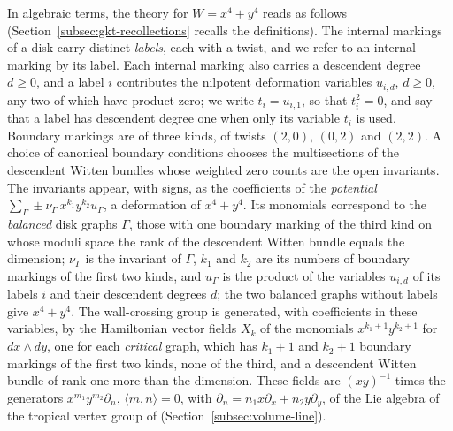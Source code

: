 In algebraic terms, the theory for $W=x^4+y^4$ reads as follows
(Section~\ref{subsec:gkt-recollections} recalls the definitions).  The
internal markings of a disk carry distinct \emph{labels}, each with a twist,
and we refer to an internal marking by its label.  Each internal marking
also carries a descendent degree $d\geq0$, and a label $i$ contributes the
nilpotent deformation variables $u_{i,d}$, $d\geq0$, any two of which have
product zero; we write $t_i=u_{i,1}$, so that $t_i^2=0$, and say that a
label has descendent degree one when only its variable $t_i$ is used.
Boundary markings are of three kinds, of twists $(2,0)$, $(0,2)$ and
$(2,2)$.  A choice of canonical boundary conditions chooses the
multisections of the descendent Witten bundles whose weighted zero counts
are the open invariants.  The invariants appear, with signs, as the
coefficients of the \emph{potential}
$\sum_\Gamma\pm\nu_\Gamma\,x^{k_1}y^{k_2}u_\Gamma$, a deformation of
$x^4+y^4$.  Its monomials correspond to the \emph{balanced} disk graphs
$\Gamma$, those with one boundary marking of the third kind on whose moduli
space the rank of the descendent Witten bundle equals the dimension;
$\nu_\Gamma$ is the invariant of $\Gamma$, $k_1$ and $k_2$ are its numbers of
boundary markings of the first two kinds, and $u_\Gamma$ is the product of
the variables $u_{i,d}$ of its labels $i$ and their descendent degrees $d$;
the two balanced graphs without labels give $x^4+y^4$.  The wall-crossing
group is generated, with coefficients in these variables, by the
Hamiltonian vector fields $X_k$ of the monomials $x^{k_1+1}y^{k_2+1}$ for
$dx\wedge dy$, one for each \emph{critical} graph, which has $k_1+1$ and
$k_2+1$ boundary markings of the first two kinds, none of the third, and a
descendent Witten bundle of rank one more than the dimension.  These fields are $(xy)^{-1}$ times the generators
$x^{m_1}y^{m_2}\partial_n$, $\langle m,n\rangle=0$, with
$\partial_n=n_1x\partial_x+n_2y\partial_y$, of the Lie algebra of the
tropical vertex group of \cite{grosspandharipandesiebert2010}
(Section~\ref{subsec:volume-line}).


